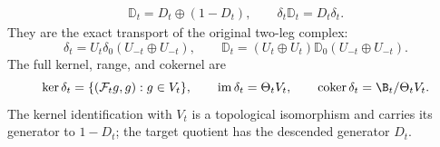 \begin{proposition}
\begin{equation}
\begin{gathered}
 \mathbb D_t=D_t\oplus(1-D_t),
 \qquad\delta_t\mathbb D_t=D_t\delta_t.
 \end{gathered}
\end{equation}
They are the exact transport of the original two-leg complex:
\begin{equation}\label{wt:eq:two-leg-conjugacy}
 \delta_t=U_t\delta_0(U_{-t}\oplus U_{-t}),\qquad
 \mathbb D_t=(U_t\oplus U_t)\mathbb D_0
                         (U_{-t}\oplus U_{-t}).
\end{equation}
The full kernel, range, and cokernel are
\begin{equation}\label{wt:eq:two-leg-kernel}
 \ker\delta_t=\{(\mathcal F_tg,g):g\in V_t\},\qquad
 \operatorname{im}\delta_t=\Theta_tV_t,\qquad
 \operatorname{coker}\delta_t=\B_t/\Theta_tV_t.
\end{equation}
The kernel identification with $V_t$ is a topological isomorphism
and carries its generator to $1-D_t$; the target quotient has
the descended generator $D_t$.
\end{proposition}

